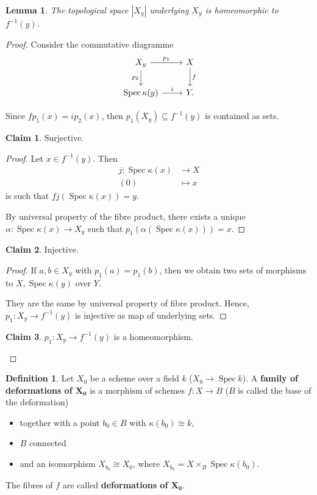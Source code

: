 \documentclass[12pt]{article}
\DeclareMathOperator{\Spec}{Spec}
\newtheorem*{lemma}{Lemma}
\theoremstyle{definition}
\newtheorem*{definition}{Definition}
\newtheorem*{claim}{Claim}
\theoremstyle{remark}
\begin{document}
\begin{lemma}
The topological space $|X_y|$ underlying $X_y$ is homeomorphic to $f^{-1}(y)$.
\end{lemma}

\begin{proof}
Consider the commutative diagramme
\[
\begin{tikzcd}
X_y\arrow[r,"p_1"]\arrow[d,"p_2",swap]&X\arrow[d,"f"]\\
\Spec\kappa(y)\arrow[r,"i"]&Y.
\end{tikzcd}
\]

Since $fp_1(x)=ip_2(x)$, then $p_1(X_y)\subseteq f^{-1}(y)$ is contained as sets.

\begin{claim}
Surjective.
\end{claim}

\begin{proof}
Let $x\in f^{-1}(y)$. Then
\begin{align*}
j:\Spec\kappa(x)&\longrightarrow X\\
(0)&\longmapsto x
\end{align*}
is such that $fj(\Spec\kappa(x))=y$.

By universal property of the fibre product, there exists a unique $\alpha:\Spec\kappa(x)\rightarrow X_y$ such that $p_1(\alpha(\Spec\kappa(x)))=x$.
\end{proof}

\begin{claim}
Injective.
\end{claim}

\begin{proof}
If $a,b\in X_y$ with $p_1(a)=p_1(b)$, then we obtain two sets of morphisms to $X,\Spec\kappa(y)$ over $Y$.

They are the same by universal property of fibre product. Hence, $p_1:X_y\rightarrow f^{-1}(y)$ is injective as map of underlying sets.
\end{proof}

\begin{claim}
$p_1:X_y\rightarrow f^{-1}(y)$ is a homeomorphism.
\end{claim}
\end{proof}

\begin{definition}
Let $X_0$ be a scheme over a field $k$ ($X_0\rightarrow\Spec k$). A \textbf{family of deformations of $\boldsymbol{X_0}$} is a morphism of schemes $f:X\rightarrow B$ ($B$ is called the base of the deformation)
\begin{itemize}[label=$-$]
\item together with a point $b_0\in B$ with $\kappa(b_0)\cong k$,
\item $B$ connected
\item and an isomorphism $X_{b_0}\cong X_0$, where $X_{b_0}=X\times_B\Spec\kappa(b_0)$.
\end{itemize}
The fibres of $f$ are called \textbf{deformations of $\boldsymbol{X_0}$}.
\end{definition}
\end{document}
